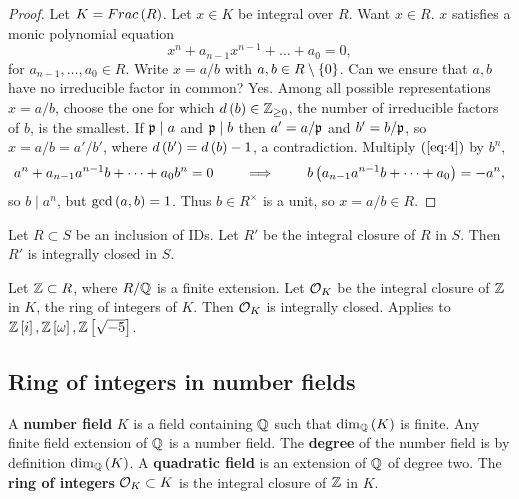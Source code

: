 \begin{proof}
Let $ K = Frac\left( R \right) $. Let $ x \in K $ be integral over $ R $. Want $ x \in R $. $ x $ satisfies a monic polynomial equation
\begin{equation}
\label{eq:4}
x^n + a_{n - 1}x^{n - 1} + \dots + a_0 = 0,
\end{equation}
for $ a_{n - 1}, \dots, a_0 \in R $. Write $ x = a / b $ with $ a, b \in R \setminus \left\{ 0 \right\} $. Can we ensure that $ a, b $ have no irreducible factor in common? Yes. Among all possible representations $ x = a / b $, choose the one for which $ d\left( b \right) \in \mathbb{Z}_{\ge 0} $, the number of irreducible factors of $ b $, is the smallest. If $ \mathfrak{p} \mid a $ and $ \mathfrak{p} \mid b $ then $ a' = a / \mathfrak{p} $ and $ b' = b / \mathfrak{p} $, so $ x = a / b = a' / b' $, where $ d\left( b' \right) = d\left( b \right) - 1 $, a contradiction. Multiply $ \left( \ref{eq:4} \right) $ by $ b^n $,
$$ a^n + a_{n - 1}a^{n - 1}b + \dots + a_0b^n = 0 \qquad \implies \qquad b\left( a_{n - 1}a^{n - 1}b + \dots + a_0 \right) = -a^n, $$
so $ b \mid a^n $, but $ \gcd\left( a, b \right) = 1 $. Thus $ b \in R^\times $ is a unit, so $ x = a / b \in R $.
\end{proof}

\begin{theorem}
Let $ R \subset S $ be an inclusion of IDs. Let $ R' $ be the integral closure of $ R $ in $ S $. Then $ R' $ is integrally closed in $ S $.
\end{theorem}

\begin{example*}
Let $ \mathbb{Z} \subset R $, where $ R / \mathbb{Q} $ is a finite extension. Let $ \mathcal{O}_K $ be the integral closure of $ \mathbb{Z} $ in $ K $, the ring of integers of $ K $. Then $ \mathcal{O}_K $ is integrally closed. Applies to $ \mathbb{Z}\left[ i \right], \mathbb{Z}\left[ \omega \right], \mathbb{Z}\left[ \sqrt{-5} \right] $.
\end{example*}

\pagebreak

\subsection{Ring of integers in number fields}

A \textbf{number field} $ K $ is a field containing $ \mathbb{Q} $ such that $ \dim_{\mathbb{Q}}\left( K \right) $ is finite. Any finite field extension of $ \mathbb{Q} $ is a number field. The \textbf{degree} of the number field is by definition $ \dim_{\mathbb{Q}}\left( K \right) $. A \textbf{quadratic field} is an extension of $ \mathbb{Q} $ of degree two. The \textbf{ring of integers} $ \mathcal{O}_K \subset K $ is the integral closure of $ \mathbb{Z} $ in $ K $.

